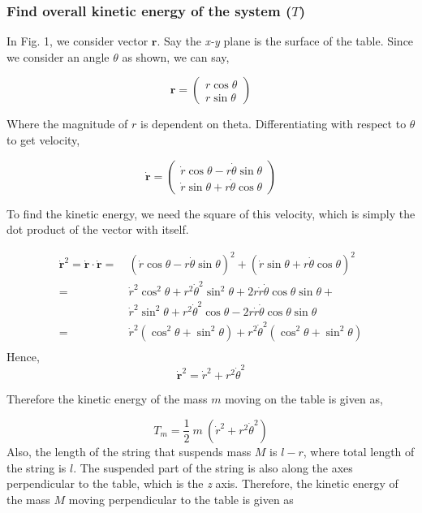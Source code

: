\documentclass[conference]{IEEEtran}
\begin{document}
\subsubsection{Find overall kinetic energy of the system ($T$)}
In Fig. 1, we consider vector $\textbf{r}$. Say the \textit{x-y} plane is the surface
of the table. Since we consider an angle $\theta$ as shown, we can say,

\[
    \textbf{r} =
    \begin{pmatrix}
        r \cos \theta\\
        r \sin \theta
    \end{pmatrix}
\]

Where the magnitude of $r$ is dependent on theta. Differentiating
with respect to $\theta$ to get velocity,

\[
    \dot{\textbf{r}} =
    \begin{pmatrix}
        \dot{r} \cos \theta - r \dot{\theta} \sin \theta\\
        \dot{r} \sin \theta + r \dot{\theta} \cos \theta
    \end{pmatrix}
\]

To find the kinetic energy, we need the square of this velocity,
which is simply the dot product of the vector with itself.

\begin{align*}
    \dot{\textbf{r}}^2 = \dot{\textbf{r}} \cdot \dot{\textbf{r}}
    =&~(\dot{r} \cos \theta - r \dot{\theta} \sin \theta)^2 +
    (\dot{r} \sin \theta + r \dot{\theta} \cos \theta)^2\\
    =&~\dot{r}^2 \cos^2 \theta + r^2 \dot{\theta}^2 \sin^2 \theta 
    + 2 r \dot{r} \dot{\theta} \cos\theta \sin\theta + \\
    &~\dot{r}^2 \sin^2 \theta + r^2 \dot{\theta}^2 \cos \theta
    - 2 r \dot{r} \dot{\theta} \cos\theta \sin\theta\\
    =&~\dot{r}^2 (\cos^2\theta + \sin^2\theta) 
    + r^2\dot{\theta}^2 (\cos^2\theta + \sin^2\theta)\\
\end{align*}
Hence,
\[
    \dot{\textbf{r}}^2 = \dot{r}^2 + r^2\dot{\theta}^2
\]

Therefore the kinetic energy of the mass $m$ moving on the table is given as,

\begin{equation} \label{prob1_ke_mass_small_m}
    T_m = \frac{1}{2}~m~(\dot{r}^2 + r^2\dot{\theta}^2)
\end{equation}
Also, the length of the string that suspends 
mass $M$ is $l-r$, where
total length of the string is $l$. The suspended part
of the string is also along the axes perpendicular to the table,
which is the \textit{z} axis. Therefore, the kinetic energy of the
mass $M$ moving perpendicular to the table is given as
\end{document}
